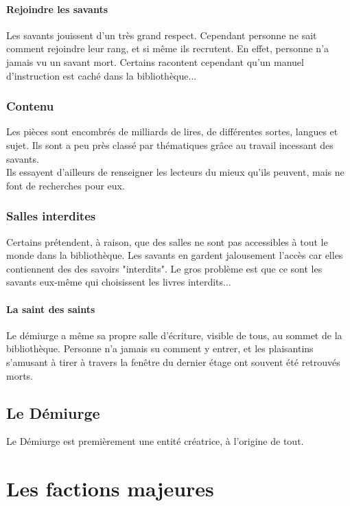 \documentclass{book}
\begin{document}
\subsubsection{Rejoindre les savants}
Les savants jouissent d'un très grand respect. Cependant personne ne sait comment rejoindre leur rang, et si même ils recrutent. En effet, personne n'a jamais vu un savant mort. Certains racontent cependant qu'un manuel d'instruction est caché dans la bibliothèque...
\subsection{Contenu}
Les pièces sont encombrés de milliards de lires, de différentes sortes, langues et sujet. Ils sont a peu près classé par thématiques grâce au travail incessant des savants.\\
Ils essayent d'ailleurs de renseigner les lecteurs du mieux qu'ils peuvent, mais ne font de recherches pour eux.
\subsection{Salles interdites}
Certains prétendent, à raison, que des salles ne sont pas accessibles à tout le monde dans la bibliothèque. Les savants en gardent jalousement l'accès car elles contiennent des des savoirs "interdits". Le gros problème est que ce sont les savants eux-même qui choisissent les livres interdits...
\subsubsection{La saint des saints}
Le démiurge a même sa propre salle d'écriture, visible de tous, au sommet de la bibliothèque. Personne n'a jamais su comment y entrer, et les plaisantins s'amusant à tirer à travers la fenêtre du dernier étage ont souvent été retrouvés morts.

\section{Le Démiurge}
Le Démiurge est premièrement une entité créatrice, à l'origine de tout.

\chapter{Les factions majeures}
\end{document}
